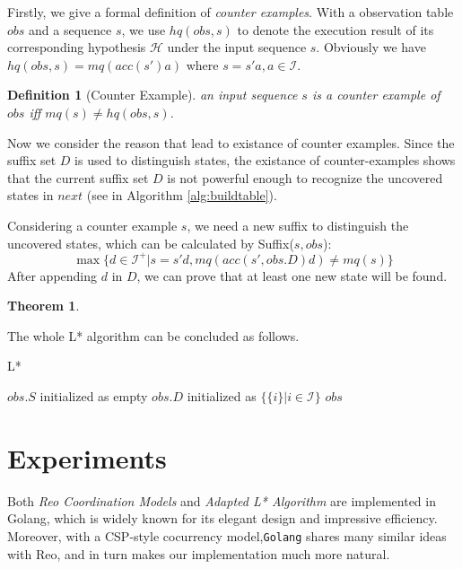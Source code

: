\documentclass[conference, a4paper]{IEEEtran}
\newtheorem{theorem}{Theorem}
\newtheorem{definition}{Definition}
\begin{document}
Firstly, we give a formal definition of \emph{counter examples}. With a observation table $obs$ and
a sequence $s$, we use $hq(obs,s)$ to denote the execution result of its corresponding hypothesis
$\mathcal{H}$ under the input sequence
$s$. Obviously we have $hq(obs,s) = mq(acc(s')a)$ where $s=s'a,a\in\mathcal{I}$.

\begin{definition}[Counter Example]
  an input sequence $s$ is a counter example of $obs$ iff $mq(s)\neq hq(obs,s)$.
\end{definition}

Now we consider the reason that lead to existance of counter examples. Since
the suffix set $D$ is used to distinguish states, the existance of counter-examples
shows that the current suffix set $D$ is not powerful enough to recognize the uncovered states in
$next$ (see in Algorithm \ref{alg:buildtable}).

Considering a counter example $s$, we need a new suffix to distinguish the uncovered states, which
can be calculated by Suffix($s,obs$):
\[
\max\{d\in\mathcal{I}^+|s=s'd, mq(acc(s',obs.D)d)\neq mq(s)\}
\]
After appending $d$ in $D$, we can prove that at least one new state will be found.

\begin{theorem}
\end{theorem}

The whole L* algorithm can be concluded as follows.
\begin{algorithm} 
  \caption{L*} 
  \label{alg:lstar}
  $obs.S$ initialized as empty\;
  $obs.D$ initialized as $\{\{i\}|i\in\mathcal{I}\}$\;
  \Return $obs$\; 
\end{algorithm}




\section{Experiments} 
\label{sec:experiment}

Both \emph{Reo Coordination Models} and \emph{Adapted L* Algorithm} are implemented in
Golang\cite{golang}, which is widely known for its elegant design and impressive efficiency.
Moreover, with a CSP-style\cite{DBLP:books/ph/Hoare85} cocurrency model,\texttt{Golang} shares many
similar ideas with Reo, and in turn makes our implementation much more natural.
\end{document}
